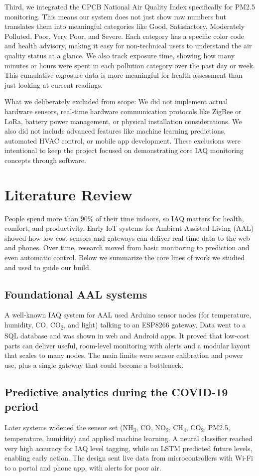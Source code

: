 \documentclass[12pt]{report}
\begin{document}
Third, we integrated the CPCB National Air Quality Index specifically for PM2.5 monitoring. This means our system does not just show raw numbers but translates them into meaningful categories like Good, Satisfactory, Moderately Polluted, Poor, Very Poor, and Severe. Each category has a specific color code and health advisory, making it easy for non-technical users to understand the air quality status at a glance. We also track exposure time, showing how many minutes or hours were spent in each pollution category over the past day or week. This cumulative exposure data is more meaningful for health assessment than just looking at current readings.

What we deliberately excluded from scope: We did not implement actual hardware sensors, real-time hardware communication protocols like ZigBee or LoRa, battery power management, or physical installation considerations. We also did not include advanced features like machine learning predictions, automated HVAC control, or mobile app development. These exclusions were intentional to keep the project focused on demonstrating core IAQ monitoring concepts through software.

\section{Literature Review}
People spend more than 90\% of their time indoors, so IAQ matters for health, comfort, and productivity. Early IoT systems for Ambient Assisted Living (AAL) showed how low-cost sensors and gateways can deliver real-time data to the web and phones. Over time, research moved from basic monitoring to prediction and even automatic control. Below we summarize the core lines of work we studied and used to guide our build.

\subsection{Foundational AAL systems}
A well-known IAQ system for AAL used Arduino sensor nodes (for temperature, humidity, CO, CO\textsubscript{2}, and light) talking to an ESP8266 gateway. Data went to a SQL database and was shown in web and Android apps. It proved that low-cost parts can deliver useful, room-level monitoring with alerts and a modular layout that scales to many nodes. The main limits were sensor calibration and power use, plus a single gateway that could become a bottleneck.

\subsection{Predictive analytics during the COVID-19 period}
Later systems widened the sensor set (NH\textsubscript{3}, CO, NO\textsubscript{2}, CH\textsubscript{4}, CO\textsubscript{2}, PM2.5, temperature, humidity) and applied machine learning. A neural classifier reached very high accuracy for IAQ level tagging, while an LSTM predicted future levels, enabling early action. The design sent live data from microcontrollers with Wi-Fi to a portal and phone app, with alerts for poor air.
\end{document}
